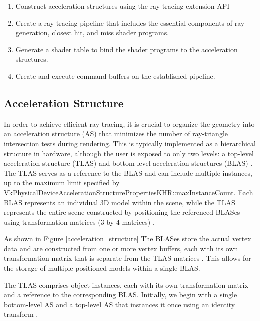 \documentclass[conference]{IEEEtran}
\begin{document}
\begin{enumerate}
    \item Construct acceleration structures using the ray tracing extension API
    \item Create a ray tracing pipeline that includes the essential components of ray generation, closest hit, and miss shader programs. 
    \item Generate a shader table to bind the shader programs to the acceleration structures. 
    \item Create and execute command buffers on the established pipeline.
\end{enumerate}
\subsection{Acceleration Structure}
In order to achieve efficient ray tracing, it is crucial to organize the geometry into an acceleration structure (AS) that minimizes the number of ray-triangle intersection tests during rendering. This is typically implemented as a hierarchical structure in hardware, although the user is exposed to only two levels: a top-level acceleration structure (TLAS) and bottom-level acceleration structures (BLAS) \cite{NVIDIA_Vulkan_Ray_Tracing_Tutorial}. The TLAS serves as a reference to the BLAS and can include multiple instances, up to the maximum limit specified by VkPhysicalDeviceAccelerationStructurePropertiesKHR::maxInstanceCount. Each BLAS represents an individual 3D model within the scene, while the TLAS represents the entire scene constructed by positioning the referenced BLASes using transformation matrices (3-by-4 matrices) \cite{NVIDIA_Vulkan_Ray_Tracing_Tutorial}.

As shown in Figure \ref{acceleration_structure} The BLASes store the actual vertex data and are constructed from one or more vertex buffers, each with its own transformation matrix that is separate from the TLAS matrices \cite{NVIDIA_Vulkan_Ray_Tracing_Tutorial}. This allows for the storage of multiple positioned models within a single BLAS. %

The TLAS comprises object instances, each with its own transformation matrix and a reference to the corresponding BLAS. Initially, we begin with a single bottom-level AS and a top-level AS that instances it once using an identity transform \cite{NVIDIA_Vulkan_Ray_Tracing_Tutorial}.
\end{document}
